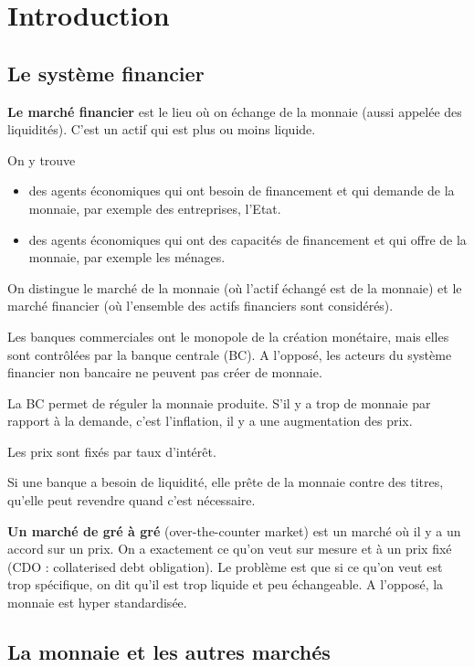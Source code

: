 \chapter{Introduction}

\section{Le système financier}
\textbf{Le marché financier} est le lieu où on échange de la monnaie (aussi appelée des liquidités). C'est un actif qui est plus ou moins liquide.

On y trouve

\begin{itemize}
	\item des agents économiques qui ont besoin de financement et qui demande de la monnaie, par exemple des entreprises, l'Etat.
	\item des agents économiques qui ont des capacités de financement et qui offre de la monnaie, par exemple les ménages.
\end{itemize}

On distingue le marché de la monnaie (où l'actif échangé est de la monnaie) et le marché financier (où l'ensemble des actifs financiers sont considérés).


Les banques commerciales ont le monopole de la création monétaire, mais elles sont contrôlées par la banque centrale (BC). A l'opposé, les acteurs du système financier non bancaire ne peuvent pas créer de monnaie.

La BC permet de réguler la monnaie produite. S'il y a trop de monnaie par rapport à la demande, c'est l'inflation, il y a une augmentation des prix.

Les prix sont fixés par taux d'intérêt.

Si une banque a besoin de liquidité, elle prête de la monnaie contre des titres, qu'elle peut revendre quand c'est nécessaire.

\textbf{Un marché de gré à gré} (over-the-counter market) est un marché où il y a un accord sur un prix. On a exactement ce qu'on veut sur mesure et à un prix fixé (CDO : collaterised debt obligation). Le problème est que si ce qu'on veut est trop spécifique, on dit qu'il est trop liquide et peu échangeable. A l'opposé, la monnaie est hyper standardisée.

\section{La monnaie et les autres marchés}

